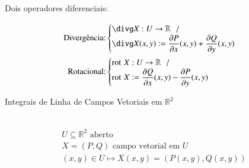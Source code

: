 \begin{center}
\end{center}

	\begin{large}
	Dois operadores diferenciais:
	\end{large}
	\begin{center}
	\begin{align*}
	\text{Divergência:}&
	\begin{cases}
	\divg X:U\to\mathbb{R}\hspace{6pt} / \\
	\divg X(x,y) \defeq \dfrac{\partial P}{\partial x}(x,y) + \dfrac{\partial Q}{\partial y}(x,y)
	\end{cases} \\
	\text{Rotacional:}&
	\begin{cases}
	\rotg X:U\to\mathbb{R}\hspace{6pt} / \\
	\rotg X \defeq \dfrac{\partial Q}{\partial x}(x,y) - \dfrac{\partial P}{\partial y}(x,y)
	\end{cases}
	\end{align*}
	\end{center}
	
\begin{large}
Integrais de Linha de Campos Vetoriais em $\mathbb{R}^2$
\end{large}\\
\begin{gather*}
U\subseteq\mathbb{R}^2 \text{	aberto} \\
X = (P,Q) \text{	campo vetorial em $U$} \\
(x,y)\in U \mapsto X(x,y) = (P(x,y),Q(x,y))
\end{gather*}	

